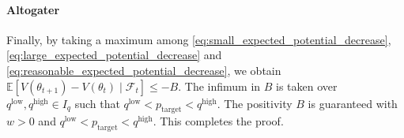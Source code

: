 \documentclass[journal]{IEEEtran}
\providecommand{\E}{\mathbb{E}} %
\renewcommand{\leq}{\leqslant} %
\theoremstyle{definition}
\begin{document}
\paragraph*{Altogater}
Finally, by taking a maximum among \eqref{eq:small_expected_potential_decrease}, \eqref{eq:large_expected_potential_decrease} and \eqref{eq:reasonable_expected_potential_decrease}, we obtain $\E[ V(\theta_{t+1}) - V(\theta_t)\mid \mathcal{F}_t ]\leq -B$.
The infimum in $B$ is taken over $q^\mathrm{low}, q^\mathrm{high}\in I_q$ such that $q^\mathrm{low}<p_\mathrm{target}<q^\mathrm{high}$.
The positivity $B$ is guaranteed with $w>0$ and $q^\mathrm{low}<p_\mathrm{target}<q^\mathrm{high}$.
This completes the proof.


\end{document}
